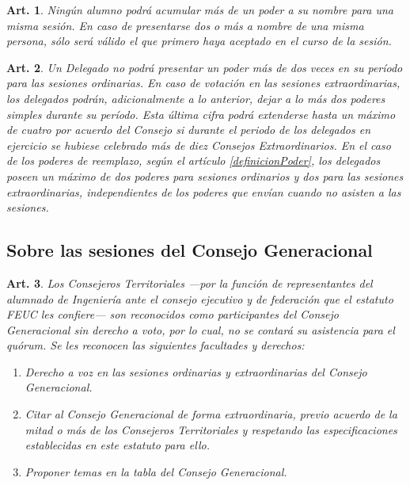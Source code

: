 \documentclass[letterpaper,11pt]{article}
\theoremstyle{plain}
\newtheorem{art}{Art.} %
\begin{document}
			\begin{art}\label{maxPoderesRecividos}
				Ningún alumno podrá acumular más de un poder a su nombre para una misma sesión. En caso de presentarse dos o más a nombre de una misma persona, sólo será válido el que primero haya aceptado en el curso de la sesión.
			\end{art}

			\begin{art}\label{maxPoderesEmitidos}
				Un Delegado no podrá presentar un poder más de dos veces en su período para las sesiones ordinarias. En caso de votación en las sesiones extraordinarias, los delegados podrán, adicionalmente a lo anterior, dejar a lo más dos poderes simples durante su período. Esta última cifra podrá extenderse hasta un máximo de cuatro por acuerdo del Consejo si durante el periodo de los delegados en ejercicio se hubiese celebrado más de diez Consejos Extraordinarios. En el caso de los poderes de reemplazo, según el artículo \ref{definicionPoder}, los delegados poseen un máximo de dos poderes para sesiones ordinarios y dos para las sesiones extraordinarias, independientes de los poderes que envían cuando no asisten a las sesiones.
			\end{art}

		\subsection*{Sobre las sesiones del Consejo Generacional}

			\begin{art}
				Los Consejeros Territoriales ---por la función de representantes del alumnado de Ingeniería ante el consejo ejecutivo y de federación que el estatuto FEUC les confiere--- son reconocidos como participantes del Consejo Generacional sin derecho a voto, por lo cual, no se contará su asistencia para el quórum. Se les reconocen las siguientes facultades y derechos:
				\begin{enumerate}
					\item Derecho a voz en las sesiones ordinarias y extraordinarias del Consejo Generacional.
					\item Citar al Consejo Generacional de forma extraordinaria, previo acuerdo de la mitad o más de los Consejeros Territoriales y respetando las especificaciones establecidas en este estatuto para ello.
					\item Proponer temas en la tabla del Consejo Generacional.
				\end{enumerate}
			\end{art}
\end{document}
